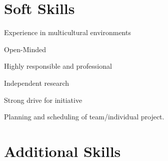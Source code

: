 \section*{Soft Skills}

{
Experience in multicultural environments

Open-Minded

Highly responsible and professional
}

{
Independent research

Strong drive for initiative

Planning and scheduling of team/individual project.
}

\section*{Additional Skills}



